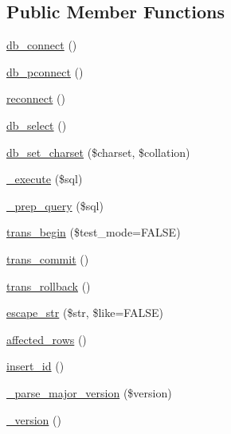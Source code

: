 \subsection*{Public Member Functions}
\begin{DoxyCompactItemize}
\item 
\hyperlink{class_c_i___d_b__mssql__driver_a6aa545dcb7768f0b62d37cdcf7f09adc}{db\-\_\-connect} ()
\item 
\hyperlink{class_c_i___d_b__mssql__driver_a0f69e662bd02de5bcf98647068e7c653}{db\-\_\-pconnect} ()
\item 
\hyperlink{class_c_i___d_b__mssql__driver_a57c19c642ab3023e28d10c50f86ff0a8}{reconnect} ()
\item 
\hyperlink{class_c_i___d_b__mssql__driver_af0c7f2602586ea2050b19fb36baefb24}{db\-\_\-select} ()
\item 
\hyperlink{class_c_i___d_b__mssql__driver_adc8cd12121dc8edda3adcadd88a97e24}{db\-\_\-set\-\_\-charset} (\$charset, \$collation)
\item 
\hyperlink{class_c_i___d_b__mssql__driver_a114ab675d89bf8324a41785fb475e86d}{\-\_\-execute} (\$sql)
\item 
\hyperlink{class_c_i___d_b__mssql__driver_a86af88ef0fa6d44ab4691e3f53270339}{\-\_\-prep\-\_\-query} (\$sql)
\item 
\hyperlink{class_c_i___d_b__mssql__driver_a90e153cf190d273336d77cce930587e1}{trans\-\_\-begin} (\$test\-\_\-mode=F\-A\-L\-S\-E)
\item 
\hyperlink{class_c_i___d_b__mssql__driver_af4fbdcdace4aa94a139b64877601fe9b}{trans\-\_\-commit} ()
\item 
\hyperlink{class_c_i___d_b__mssql__driver_a53f76d4dfcd6ac04fb653982442aeef8}{trans\-\_\-rollback} ()
\item 
\hyperlink{class_c_i___d_b__mssql__driver_aaba16891c8c93600a87075800cc5b72b}{escape\-\_\-str} (\$str, \$like=F\-A\-L\-S\-E)
\item 
\hyperlink{class_c_i___d_b__mssql__driver_a77248aaad33eb132c04cc4aa3f4bc8cb}{affected\-\_\-rows} ()
\item 
\hyperlink{class_c_i___d_b__mssql__driver_a933f2cde8dc7f87875e257d0a4902e99}{insert\-\_\-id} ()
\item 
\hyperlink{class_c_i___d_b__mssql__driver_a1d7c0b00a2f4b332c9ace7892016b37d}{\-\_\-parse\-\_\-major\-\_\-version} (\$version)
\item 
\hyperlink{class_c_i___d_b__mssql__driver_ac997a462bb342f97f414910f0e033fb6}{\-\_\-version} ()
\item 

\end{DoxyCompactItemize}
